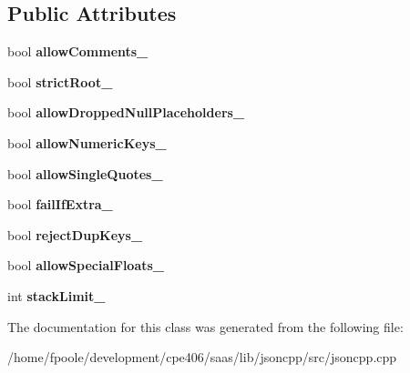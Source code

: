 \subsection*{Public Attributes}
\begin{DoxyCompactItemize}
\item 
\hypertarget{class_json_1_1_our_features_ac71bb7ba7363d3b05ed76602b036ce33}{}bool {\bfseries allow\+Comments\+\_\+}\label{class_json_1_1_our_features_ac71bb7ba7363d3b05ed76602b036ce33}

\item 
\hypertarget{class_json_1_1_our_features_a2095f66a776c0a4ae6cc931a0c94242e}{}bool {\bfseries strict\+Root\+\_\+}\label{class_json_1_1_our_features_a2095f66a776c0a4ae6cc931a0c94242e}

\item 
\hypertarget{class_json_1_1_our_features_a13963bc44bf948eec1968f7ff8e8f5f1}{}bool {\bfseries allow\+Dropped\+Null\+Placeholders\+\_\+}\label{class_json_1_1_our_features_a13963bc44bf948eec1968f7ff8e8f5f1}

\item 
\hypertarget{class_json_1_1_our_features_af6973fc7e774ce2d634ba99442aeb91a}{}bool {\bfseries allow\+Numeric\+Keys\+\_\+}\label{class_json_1_1_our_features_af6973fc7e774ce2d634ba99442aeb91a}

\item 
\hypertarget{class_json_1_1_our_features_abbd6c196d7a22e2a360a59887eda4610}{}bool {\bfseries allow\+Single\+Quotes\+\_\+}\label{class_json_1_1_our_features_abbd6c196d7a22e2a360a59887eda4610}

\item 
\hypertarget{class_json_1_1_our_features_ae8ad25b90706c78f1a8fe929191ac61b}{}bool {\bfseries fail\+If\+Extra\+\_\+}\label{class_json_1_1_our_features_ae8ad25b90706c78f1a8fe929191ac61b}

\item 
\hypertarget{class_json_1_1_our_features_a39b8e0b86b1c24a45e800c023bb715aa}{}bool {\bfseries reject\+Dup\+Keys\+\_\+}\label{class_json_1_1_our_features_a39b8e0b86b1c24a45e800c023bb715aa}

\item 
\hypertarget{class_json_1_1_our_features_af760f91cc2a7af37e44f78fb466061bb}{}bool {\bfseries allow\+Special\+Floats\+\_\+}\label{class_json_1_1_our_features_af760f91cc2a7af37e44f78fb466061bb}

\item 
\hypertarget{class_json_1_1_our_features_a9a786713902d14be6d57a08cc03ccfff}{}int {\bfseries stack\+Limit\+\_\+}\label{class_json_1_1_our_features_a9a786713902d14be6d57a08cc03ccfff}

\end{DoxyCompactItemize}


The documentation for this class was generated from the following file\+:\begin{DoxyCompactItemize}
\item 
/home/fpoole/development/cpe406/saas/lib/jsoncpp/src/jsoncpp.\+cpp\end{DoxyCompactItemize}
